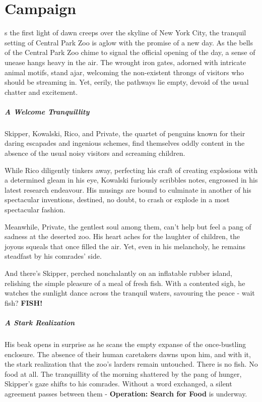 \chapter{Campaign}
\entryfont \noindent {}s the first light of dawn creeps over the skyline of New York City, the tranquil setting of Central Park Zoo is aglow with the promise of a new day. As the bells of the Central Park Zoo chime to signal the official opening of the day, a sense of unease hangs heavy in the air. The wrought iron gates, adorned with intricate animal motifs, stand ajar, welcoming the non-existent throngs of visitors who should be streaming in. Yet, eerily, the pathways lie empty, devoid of the usual chatter and excitement.\\

\paragraph*{A Welcome Tranquillity}
Skipper, Kowalski, Rico, and Private, the quartet of penguins known for their daring escapades and ingenious schemes, find themselves oddly content in the absence of the usual noisy visitors and screaming children.

While Rico diligently tinkers away, perfecting his craft of creating explosions with a determined gleam in his eye, Kowalski furiously scribbles notes, engrossed in his latest research endeavour. His musings are bound to culminate in another of his spectacular inventions, destined, no doubt, to crash or explode in a most spectacular fashion.

Meanwhile, Private, the gentlest soul among them, can't help but feel a pang of sadness at the deserted zoo. His heart aches for the laughter of children, the joyous squeals that once filled the air. Yet, even in his melancholy, he remains steadfast by his comrades' side.

And there's Skipper, perched nonchalantly on an inflatable rubber island, relishing the simple pleasure of a meal of fresh fish. With a contented sigh, he watches the sunlight dance across the tranquil waters, savouring the peace - wait fish? \textbf{FISH!}\\

\paragraph*{A Stark Realization}
His beak opens in surprise as he scans the empty expanse of the once-bustling enclosure. The absence of their human caretakers dawns upon him, and with it, the stark realization that the zoo's larders remain untouched. There is no fish. No food at all. The tranquillity of the morning shattered by the pang of hunger, Skipper's gaze shifts to his comrades. Without a word exchanged, a silent agreement passes between them - \textbf{Operation: Search for Food} is underway.\\

